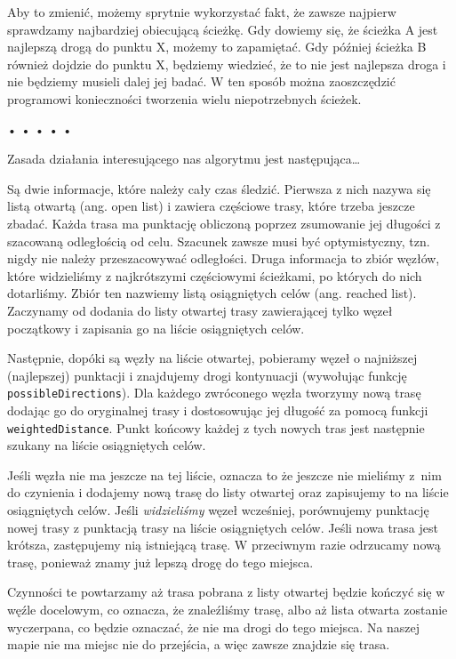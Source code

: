   
Aby to zmienić, możemy sprytnie wykorzystać fakt, że zawsze najpierw sprawdzamy najbardziej obiecującą ścieżkę. Gdy dowiemy się, że ścieżka A jest najlepszą drogą do punktu X, możemy to zapamiętać. Gdy później ścieżka B również dojdzie do punktu X, będziemy wiedzieć, że to nie jest najlepsza droga i nie będziemy musieli dalej jej badać. W ten sposób można zaoszczędzić programowi konieczności tworzenia wielu niepotrzebnych ścieżek.



\begin{center}
• • • • •
\end{center}

  
Zasada działania interesującego nas algorytmu jest następująca…

  
Są dwie informacje, które należy cały czas śledzić. Pierwsza z nich nazywa się listą otwartą (ang. open list) i zawiera częściowe trasy, które trzeba jeszcze zbadać. Każda trasa ma punktację obliczoną poprzez zsumowanie jej długości z szacowaną odległością od celu. Szacunek zawsze musi być optymistyczny, tzn. nigdy nie należy przeszacowywać odległości. Druga informacja to zbiór węzłów, które widzieliśmy z najkrótszymi częściowymi ścieżkami, po których do nich dotarliśmy. Zbiór ten nazwiemy listą osiągniętych celów (ang. reached list). Zaczynamy od dodania do listy otwartej trasy zawierającej tylko węzeł początkowy i zapisania go na liście osiągniętych celów.

  
Następnie, dopóki są węzły na liście otwartej, pobieramy węzeł o najniższej (najlepszej) punktacji i znajdujemy drogi kontynuacji (wywołując funkcję \texttt{possibleDirections}). Dla każdego zwróconego węzła tworzymy nową trasę dodając go do oryginalnej trasy i dostosowując jej długość za pomocą funkcji \texttt{weightedDistance}. Punkt końcowy każdej z tych nowych tras jest następnie szukany na liście osiągniętych celów.

  
Jeśli węzła nie ma jeszcze na tej liście, oznacza to że jeszcze nie mieliśmy z~nim do czynienia i dodajemy nową trasę do listy otwartej oraz zapisujemy to na liście osiągniętych celów. Jeśli \emph{widzieliśmy} węzeł wcześniej, porównujemy punktację nowej trasy z punktacją trasy na liście osiągniętych celów. Jeśli nowa trasa jest krótsza, zastępujemy nią istniejącą trasę. W przeciwnym razie odrzucamy nową trasę, ponieważ znamy już lepszą drogę do tego miejsca.

  
Czynności te powtarzamy aż trasa pobrana z listy otwartej będzie kończyć się w węźle docelowym, co oznacza, że znaleźliśmy trasę, albo aż lista otwarta zostanie wyczerpana, co będzie oznaczać, że nie ma drogi do tego miejsca. Na naszej mapie nie ma miejsc nie do przejścia, a więc zawsze znajdzie się trasa.

